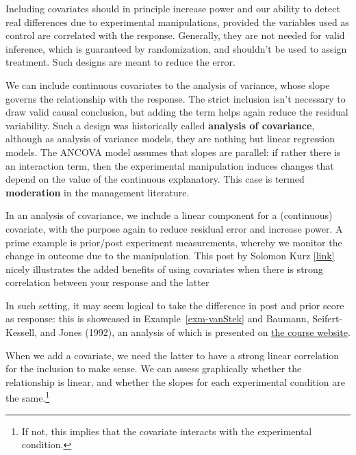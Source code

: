 \documentclass[
  11pt,
  letterpaper,
]{scrbook}
\theoremstyle{definition}
\theoremstyle{definition}
\theoremstyle{remark}
\begin{document}
Including covariates should in principle increase power and our ability
to detect real differences due to experimental manipulations, provided
the variables used as control are correlated with the response.
Generally, they are not needed for valid inference, which is guaranteed
by randomization, and shouldn't be used to assign treatment. Such
designs are meant to reduce the error.

We can include continuous covariates to the analysis of variance, whose
slope governs the relationship with the response. The strict inclusion
isn't necessary to draw valid causal conclusion, but adding the term
helps again reduce the residual variability. Such a design was
historically called \textbf{analysis of covariance}, although as
analysis of variance models, they are nothing but linear regression
models. The ANCOVA model assumes that slopes are parallel: if rather
there is an interaction term, then the experimental manipulation induces
changes that depend on the value of the continuous explanatory. This
case is termed \textbf{moderation} in the management literature.

In an analysis of covariance, we include a linear component for a
(continuous) covariate, with the purpose again to reduce residual error
and increase power. A prime example is prior/post experiment
measurements, whereby we monitor the change in outcome due to the
manipulation. This post by Solomon Kurz
\href{https://solomonkurz.netlify.app/blog/2023-04-12-boost-your-power-with-baseline-covariates/}{{[}link{]}}
nicely illustrates the added benefits of using covariates when there is
strong correlation between your response and the latter

In such setting, it may seem logical to take the difference in post and
prior score as response: this is showcased in Example~\ref{exm-vanStek}
and Baumann, Seifert-Kessell, and Jones (1992), an analysis of which is
presented on \href{https://edsm.rbind.io/example/06-ancova/}{the course
website}.

When we add a covariate, we need the latter to have a strong linear
correlation for the inclusion to make sense. We can assess graphically
whether the relationship is linear, and whether the slopes for each
experimental condition are the same.\footnote{If not, this implies that
  the covariate interacts with the experimental condition.}
\end{document}

